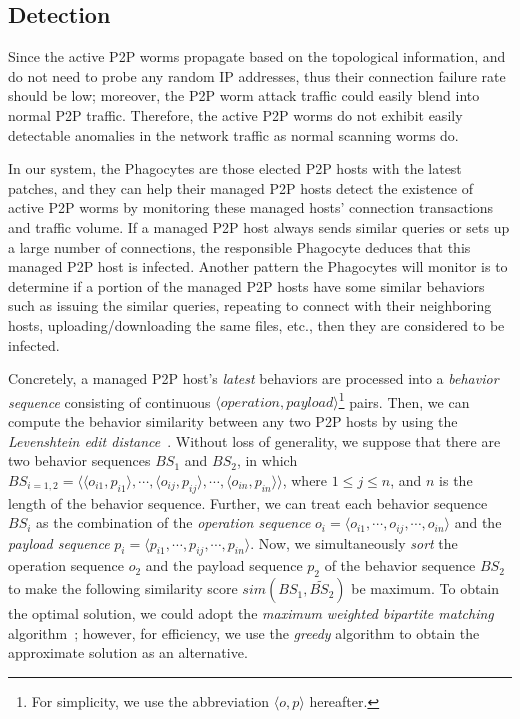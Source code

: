 \documentclass[times,10pt,twocolumn]{article}
\begin{document}
\subsection{Detection}
\label{subsec:detection}

Since the active P2P worms propagate based on the topological
information, and do not need to probe any random IP addresses, thus
their connection failure rate should be low; moreover, the P2P worm
attack traffic could easily blend into normal P2P traffic.
Therefore, the active P2P worms do not exhibit easily detectable
anomalies in the network traffic as normal scanning worms do.




In our system, the Phagocytes are those elected P2P hosts with the
latest patches, and they can help their managed P2P hosts detect the
existence of active P2P worms by monitoring these managed hosts'
connection transactions and traffic volume. If a managed P2P host
always sends similar queries or sets up a large number of
connections, the responsible Phagocyte deduces that this managed P2P
host is infected. Another pattern the Phagocytes will monitor is to
determine if a portion of the managed P2P hosts have some similar
behaviors such as issuing the similar queries, repeating to connect
with their neighboring hosts, uploading/downloading the same files,
etc., then they are considered to be infected.





Concretely, a managed P2P host's \emph{latest} behaviors are
processed into a \emph{behavior sequence} consisting of continuous
$\langle operation, payload \rangle$\footnote{For simplicity, we use
the abbreviation $\langle o, p \rangle$ hereafter.} pairs. Then, we
can compute the behavior similarity between any two P2P hosts by
using the \emph{Levenshtein edit distance}~\cite{Levenshtein66}.
Without loss of generality, we suppose that there are two behavior
sequences $BS_1$ and $BS_2$, in which $BS_{i=1,2} = \langle \langle
o_{i1}, p_{i1} \rangle, \cdots, \langle o_{ij}, p_{ij} \rangle,
\cdots, \langle o_{in}, p_{in} \rangle \rangle$, where $1 \leq j
\leq n$, and $n$ is the length of the behavior sequence. Further, we
can treat each behavior sequence $BS_i$ as the combination of the
\emph{operation sequence} $o_i = \langle o_{i1}, \cdots, o_{ij},
\cdots, o_{in} \rangle$ and the \emph{payload sequence} $p_i =
\langle p_{i1}, \cdots, p_{ij}, \cdots, p_{in} \rangle$. Now, we
simultaneously \emph{sort} the operation sequence $o_2$ and the
payload sequence $p_2$ of the behavior sequence $BS_2$ to make the
following similarity score $sim(BS_1, \widetilde{BS_2})$ be maximum.
To obtain the optimal solution, we could adopt the \emph{maximum
weighted bipartite matching} algorithm~\cite{graph00}; however, for
efficiency, we use the \emph{greedy} algorithm to obtain the
approximate solution as an alternative.
\end{document}
